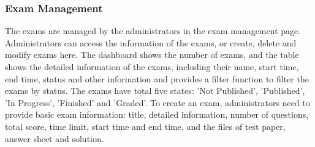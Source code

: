 \documentclass[12pt]{article}
\begin{document}
\subsubsection{Exam Management}
The exams are managed by the administrators in the exam management page. Administrators can access the information of the exams, or create, delete and modify exams here.
The dashboard shows the number of exams, and the table shows the detailed information of the exams, including their name, start time, end time, status and other information and
provides a filter function to filter the exams by status.
The exams have total five states: 'Not Published', 'Published', 'In Progress', 'Finished' and 'Graded'.
To create an exam, administrators need to provide basic exam information: title, detailed information, number of questions, total score,
time limit, start time and end time, and the files of test paper, answer sheet and solution.


  
\end{document}
